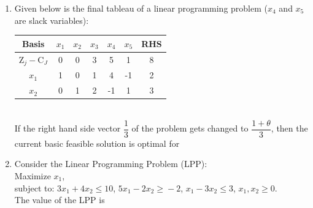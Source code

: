 \documentclass[journal,12pt,twocolumn]{IEEEtran}
\begin{document}
\begin{enumerate}
\begin{enumerate}[(A)]
\end{enumerate}

\item Given below is the final tableau of a linear programming problem ($x_4$ and $x_5$ are slack variables): \bigskip

\begin{tabular}{|c|c|c|c|c|c|c|} \hline
Basis & $x_1$ & $x_2$ & $x_3$ & $x_4$ & $x_5$ & RHS \\ \hline
$\text{Z}_j- \text{C}_J$ & 0 & 0 & 3 & 5 & 1 & 8 \\
$x_1$ & 1 & 0 & 1 & 4 & -1 & 2 \\
$x_2$ & 0 & 1 & 2 & -1 & 1 & 3 \\ \hline
\end{tabular}
\\
\bigskip
If the right hand side vector $\dfrac{1}{3}$ of the problem gets changed to $\dfrac{1+\theta}{3}$, then the current basic feasible solution is optimal for
\begin{enumerate}[(A)]
\end{enumerate}

\item Consider the Linear Programming Problem (LPP):\\
Maximize $x_1$,\\
subject to: $3x_1 \! + 4x_2 \! \leqslant \! 10$, $5x_1 \! - \! 2x_2 \! \geqslant \! -2$, $x_1 \! - \! 3x_2 \! \leqslant \! 3$, $x_1, \! x_2 \! \geqslant \! 0$. \\
The value of the LPP is \\
\begin{enumerate}[(A)]
\end{enumerate}


\end{enumerate}
\end{document}
